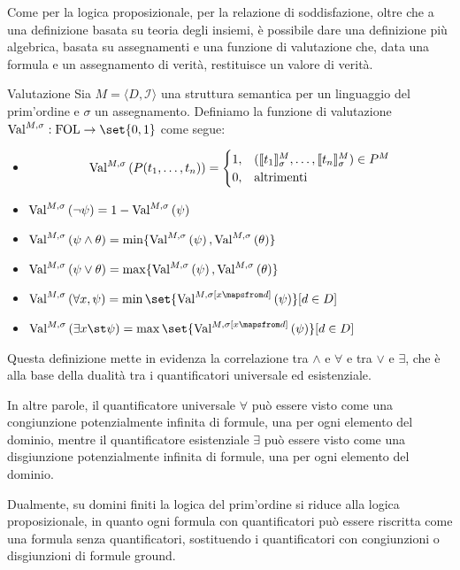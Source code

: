 Come per la logica proposizionale, per la relazione di soddisfazione, oltre che a una definizione basata su teoria degli insiemi, è possibile dare una definizione più algebrica, basata su assegnamenti e una funzione di valutazione che, data una formula e un assegnamento di verità, restituisce un valore di verità. 

\begin{definition}{Valutazione}
Sia \(M = \langle D, \mathcal{I} \rangle\) una struttura semantica per un linguaggio del prim'ordine e \(\sigma\) un assegnamento. Definiamo la funzione di valutazione \(\Val{M,\sigma}: \FOL \to \set{0,1}\) come segue:
\begin{itemize}
  \item \[\Val{M,\sigma}[P(t_1,\ldots,t_n)] = \begin{cases}
    1, & (\den{t_1}[M][\sigma], \ldots, \den{t_n}[M][\sigma]) \in P^M \\
    0, & \text{altrimenti}
  \end{cases}\]
  \item \(\Val{M,\sigma}[\neg \psi] = 1 - \Val{M,\sigma}[\psi]\)
  \item \(\Val{M,\sigma}[\psi\land\theta] = \min\{\Val{M,\sigma}[\psi], \Val{M,\sigma}[\theta]\}\)
  \item \(\Val{M,\sigma}[\psi\lor\theta] = \max\{\Val{M,\sigma}[\psi], \Val{M,\sigma}[\theta]\}\)
  \item \(\Val{M,\sigma}[\forall x, \psi] = \min \set{\Val{M,\sigma[x \mapsfrom d]}[\psi] }[ d\in D]\)
  \item \(\Val{M,\sigma}[\exists x\st \psi] = \max \set{\Val{M,\sigma[x \mapsfrom d]}[\psi] }[ d\in D]\)
\end{itemize}
\end{definition}

Questa definizione mette in evidenza la correlazione tra \(\land\) e \(\forall\) e tra \(\lor\) e \(\exists\), che è alla base della dualità tra i quantificatori universale ed esistenziale.

In altre parole, il quantificatore universale \(\forall\) può essere visto come una congiunzione potenzialmente infinita di formule, una per ogni elemento del dominio, mentre il quantificatore esistenziale \(\exists\) può essere visto come una disgiunzione potenzialmente infinita di formule, una per ogni elemento del dominio.

Dualmente, su domini finiti la logica del prim'ordine si riduce alla logica proposizionale, in quanto ogni formula con quantificatori può essere riscritta come una formula senza quantificatori, sostituendo i quantificatori con congiunzioni o disgiunzioni di formule ground.

